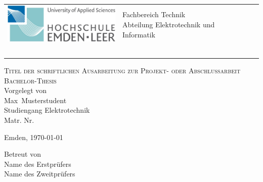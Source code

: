 \begin{titlepage}

\vspace{-0.5cm}
\hspace{-2.0cm}
\begin{tabular}{p{8.0cm} p{8.0cm}}
  \includegraphics[width = 6.0cm]{img/hsel-allgemein} &
   \parbox[b]{8.0cm}{
     {\large 	Fachbereich Technik }\\
     {\large 	Abteilung Elektrotechnik und Informatik }     
    } & ~ \\
   & ~ \\
   \hline
\end{tabular}
%
\begin{center}

\vspace{2.5cm}%
\LARGE{\textsc{ %
Titel der schriftlichen Ausarbeitung zur Projekt- oder Abschlussarbeit}}\\

\vspace{2.5cm}%
\LARGE{\textsc{%
{Bachelor-Thesis} %
}}\\

\vspace{2cm}%
\large
Vorgelegt von\\ Max~Musterstudent\\ Studiengang Elektrotechnik\\ Matr. Nr. 

\vspace{1cm} 
Emden, \today

\vspace{3.5cm}%
Betreut von\\ Name des Erstprüfers\\ Name des Zweitprüfers

\end{center}
\normalsize
\end{titlepage}
